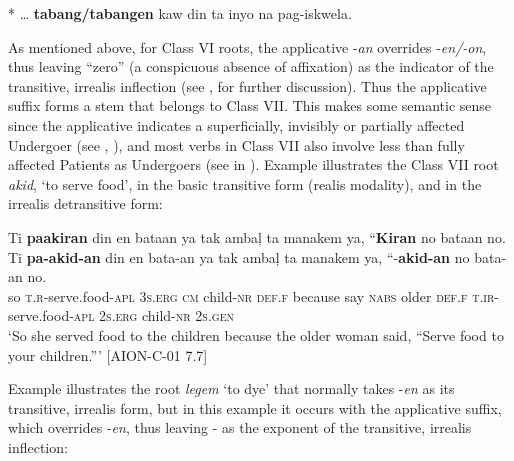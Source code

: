 * … \textbf{tabang/tabangen} kaw din ta inyo na pag-iskwela.
\z\clearpage

As mentioned above, for Class VI roots, the applicative -\textit{an} overrides -\textit{en/-on}, thus leaving “zero” (a conspicuous absence of affixation) as the indicator of the transitive, irrealis inflection (see ,  for further discussion). Thus the applicative suffix forms a stem that belongs to Class VII. This makes some semantic sense since the applicative indicates a superficially, invisibly or partially affected Undergoer (see , ), and most verbs in Class VII also involve less than fully affected Patients as Undergoers (see  in ). Example  illustrates the Class VII root \textit{akid}, ‘to serve food’, in the basic transitive form (realis modality), and in the irrealis detransitive form:

\ea
\label{bkm:Ref447101267}
Ti  \textbf{paakiran}  din  en  bataan  ya  tak  ambaļ ta  manakem  ya,  “\textbf{Kiran}  no  bataan  no. \\\smallskip
 \gll Ti  \textbf{pa-akid-an}  din  en  bata-an  ya  tak  ambaļ ta  manakem  ya,  “\emptyset{}-\textbf{akid-an}  no  bata-an  no. \\
so  \textsc{t.r}-serve.food-\textsc{apl}  3\textsc{s.erg}  \textsc{cm}  child-\textsc{nr}  \textsc{def.f}  because  say
\textsc{nabs}  older  \textsc{def.f}  \textsc{t.ir}-serve.food-\textsc{apl}  2\textsc{s.erg}  child-\textsc{nr}  2\textsc{s.gen} \\
\glt `So she served food to the children because the older woman said, “Serve food to your children.”' [AION-C-01 7.7]
\z

Example  illustrates the root \textit{legem} ‘to dye’ that normally takes -\textit{en} as its transitive, irrealis form, but in this example it occurs with the applicative suffix, which overrides -\textit{en}, thus leaving \emptyset{}- as the exponent of the transitive, irrealis inflection:


